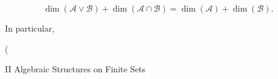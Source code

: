 $$\dim(\mathcal{A} \vee \mathcal{B}) + \dim(\mathcal{A} \cap \mathcal{B}) = \dim(\mathcal{A}) + \dim(\mathcal{B}).$$

In particular,

$$\dim( \oplus \

II Algebraic Structures on Finite Sets
